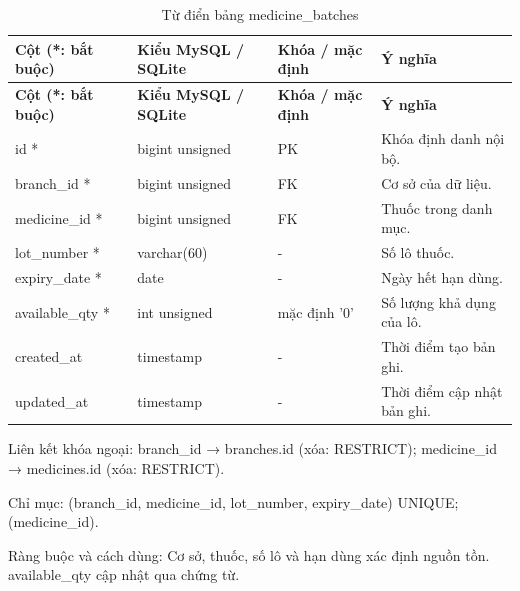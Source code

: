 {\fontsize{10}{12}\selectfont\setlength{\tabcolsep}{3pt}\renewcommand{\arraystretch}{1.12}
\begin{longtable}{@{}L{\textwidth-4.86pt\relax} L{\textwidth-3.96pt\relax} L{\textwidth-2.88pt\relax} L{\textwidth-6.3pt\relax}@{}}
\caption{Từ điển bảng medicine\_\allowbreak{}batches}\\
\toprule
\textbf{Cột (*:\allowbreak{} bắt buộc)} & \textbf{Kiểu My\allowbreak{}SQL /\allowbreak{} SQLite} & \textbf{Khóa /\allowbreak{} mặc định} & \textbf{Ý nghĩa}\\\midrule
\endfirsthead
\toprule
\textbf{Cột (*:\allowbreak{} bắt buộc)} & \textbf{Kiểu My\allowbreak{}SQL /\allowbreak{} SQLite} & \textbf{Khóa /\allowbreak{} mặc định} & \textbf{Ý nghĩa}\\\midrule
\endhead
\bottomrule\endlastfoot
id * & bigint unsigned & PK & Khóa định danh nội bộ.\allowbreak{}\\[1pt]
branch\_\allowbreak{}id * & bigint unsigned & FK & Cơ sở của dữ liệu.\allowbreak{}\\[1pt]
medicine\_\allowbreak{}id * & bigint unsigned & FK & Thuốc trong danh mục.\allowbreak{}\\[1pt]
lot\_\allowbreak{}number * & varchar(60) & - & Số lô thuốc.\allowbreak{}\\[1pt]
expiry\_\allowbreak{}date * & date & - & Ngày hết hạn dùng.\allowbreak{}\\[1pt]
available\_\allowbreak{}qty * & int unsigned & mặc định '0' & Số lượng khả dụng của lô.\allowbreak{}\\[1pt]
created\_\allowbreak{}at & timestamp & - & Thời điểm tạo bản ghi.\allowbreak{}\\[1pt]
updated\_\allowbreak{}at & timestamp & - & Thời điểm cập nhật bản ghi.\allowbreak{}\\[1pt]
\end{longtable}}
Liên kết khóa ngoại:\allowbreak{} branch\_\allowbreak{}id → branches.\allowbreak{}id (xóa:\allowbreak{} RESTRICT); medicine\_\allowbreak{}id → medicines.\allowbreak{}id (xóa:\allowbreak{} RESTRICT).\allowbreak{}

Chỉ mục:\allowbreak{} (branch\_\allowbreak{}id, medicine\_\allowbreak{}id, lot\_\allowbreak{}number, expiry\_\allowbreak{}date) UNIQUE; (medicine\_\allowbreak{}id).\allowbreak{}

Ràng buộc và cách dùng:\allowbreak{} Cơ sở, thuốc, số lô và hạn dùng xác định nguồn tồn.\allowbreak{} available\_\allowbreak{}qty cập nhật qua chứng từ.\allowbreak{}

